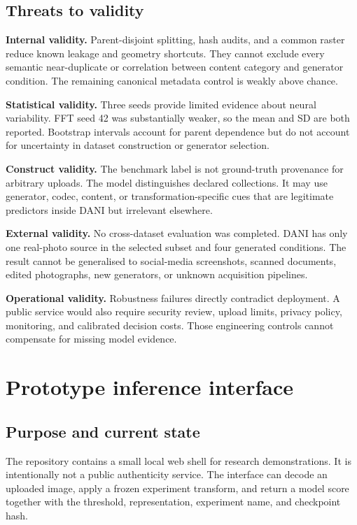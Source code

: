 \documentclass[12pt,a4paper]{article}
\begin{document}
\subsection{Threats to validity}

\textbf{Internal validity.} Parent-disjoint splitting, hash audits, and a common raster reduce known
leakage and geometry shortcuts. They cannot exclude every semantic near-duplicate or correlation
between content category and generator condition. The remaining canonical metadata control is
weakly above chance.

\textbf{Statistical validity.} Three seeds provide limited evidence about neural variability. FFT
seed 42 was substantially weaker, so the mean and SD are both reported. Bootstrap intervals account
for parent dependence but do not account for uncertainty in dataset construction or generator
selection.

\textbf{Construct validity.} The benchmark label is not ground-truth provenance for arbitrary
uploads. The model distinguishes declared collections. It may use generator, codec, content, or
transformation-specific cues that are legitimate predictors inside DANI but irrelevant elsewhere.

\textbf{External validity.} No cross-dataset evaluation was completed. DANI has only one real-photo
source in the selected subset and four generated conditions. The result cannot be generalised to
social-media screenshots, scanned documents, edited photographs, new generators, or unknown
acquisition pipelines.

\textbf{Operational validity.} Robustness failures directly contradict deployment. A public service
would also require security review, upload limits, privacy policy, monitoring, and calibrated
decision costs. Those engineering controls cannot compensate for missing model evidence.

\section{Prototype inference interface}

\subsection{Purpose and current state}

The repository contains a small local web shell for research demonstrations. It is intentionally
not a public authenticity service. The interface can decode an uploaded image, apply a frozen
experiment transform, and return a model score together with the threshold, representation,
experiment name, and checkpoint hash.
\end{document}
